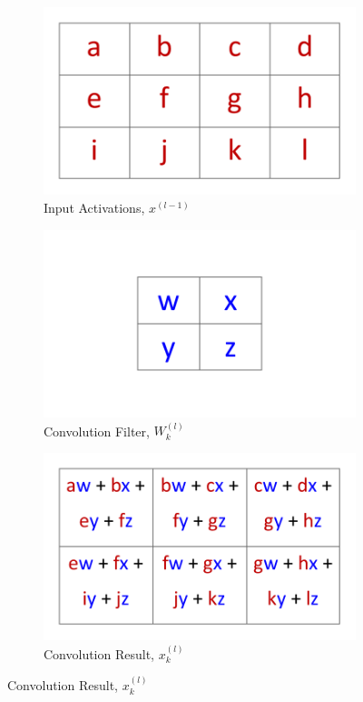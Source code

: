 \documentclass[12pt,letterpaper]{article}
\begin{document}
\begin{figure}[H]
\begin{center}

	\begin{subfigure}{0.45\textwidth}
	\includegraphics[scale=0.6]{../figures/2DConvExample(a)}
	\caption{Input Activations, $x^{(l-1)}$}
	\end{subfigure}
	
	\begin{subfigure}{0.45\textwidth}
	\includegraphics[scale=0.6]{../figures/2DConvExample(b)}
	\caption{Convolution Filter, $W^{(l)}_k$}
	\end{subfigure}
	
	\begin{subfigure}{0.9\textwidth}
	\centering
	\includegraphics[scale=0.6]{../figures/2DConvExample(c)}
	\caption{Convolution Result, $x^{(l)}_k$}
	\end{subfigure}
	

\end{center}
\end{figure}
\end{document}
